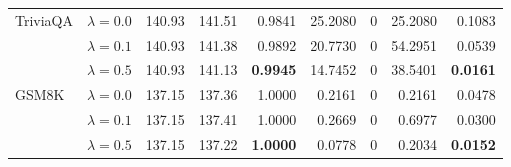 \begin{table}[t]
{\begin{tabular}{l l rrrrrrr}
\midrule
TriviaQA & $\lambda{=}0.0$ & 140.93 & 141.51 & 0.9841 & 25.2080 & \cellcolor{cyan!12} $0$ & 25.2080 & 0.1083 \\
 & $\lambda{=}0.1$ & 140.93 & 141.38 & 0.9892 & 20.7730 & \cellcolor{cyan!12} $0$ & 54.2951 & 0.0539 \\
 & $\lambda{=}0.5$ & 140.93 & 141.13 & \textbf{0.9945} & 14.7452 & \cellcolor{cyan!12} $0$ & 38.5401 & \textbf{0.0161} \\
\midrule
GSM8K & $\lambda{=}0.0$ & 137.15 & 137.36 & 1.0000 & 0.2161 & \cellcolor{cyan!12} $0$ & 0.2161 & 0.0478 \\
 & $\lambda{=}0.1$ & 137.15 & 137.41 & 1.0000 & 0.2669 & \cellcolor{cyan!12} $0$ & 0.6977 & 0.0300 \\
 & $\lambda{=}0.5$ & 137.15 & 137.22 & \textbf{1.0000} & 0.0778 & \cellcolor{cyan!12} $0$ & 0.2034 & \textbf{0.0152} \\
\bottomrule
\end{tabular}}
\end{table}